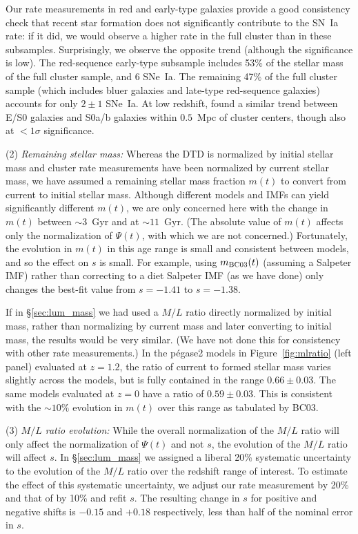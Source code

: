 Our rate measurements in red and early-type galaxies provide a good
consistency check that recent star formation does not significantly
contribute to the SN~Ia rate: if it did, we would observe a higher
rate in the full cluster than in these subsamples. Surprisingly, we
observe the opposite trend (although the significance is low). The
red-sequence early-type subsample includes 53\% of the stellar mass of
the full cluster sample, and 6 SNe~Ia. The remaining 47\% of the full
cluster sample (which includes bluer galaxies and late-type
red-sequence galaxies) accounts for only $2 \pm 1$ SNe~Ia. At low
redshift, \citet{mannucci08a} found a similar trend between E/S0
galaxies and S0a/b galaxies within $0.5$~Mpc of cluster centers,
though also at $<1\sigma$ significance.

(2) \emph{Remaining stellar mass:} Whereas the DTD is normalized by
initial stellar mass and cluster rate measurements have been
normalized by current stellar mass, we have assumed a remaining
stellar mass fraction $m(t)$ to convert from current to initial
stellar mass. Although different models and IMFs can yield significantly
different $m(t)$, we are only concerned here with the change in $m(t)$
between $\sim 3$~Gyr and at $\sim 11$~Gyr. (The absolute value of
$m(t)$ affects only the normalization of $\Psi(t)$, with which we are
not concerned.) Fortunately, the evolution in $m(t)$ in this age range
is small and consistent between models, and so the effect on $s$ is
small. For example, using $m_{\rm BC03}(t)$ (assuming a Salpeter IMF)
rather than correcting to a diet Salpeter IMF (as we have done) only
changes the best-fit value from $s=-1.41$ to $s=-1.38$.

If in \S\ref{sec:lum_mass} we had used a $M/L$ ratio directly
normalized by initial mass, rather than normalizing by current mass
and later converting to initial mass, the results would be very
similar. (We have not done this for consistency with other rate
measurements.) In the {\sc p\'egase2} models in
Figure~\ref{fig:mlratio} (left panel) evaluated at $z=1.2$, the ratio
of current to formed stellar mass varies slightly across the models,
but is fully contained in the range $0.66 \pm 0.03$. The same models
evaluated at $z=0$ have a ratio of $0.59 \pm 0.03$. This is consistent
with the $\sim 10\%$ evolution in $m(t)$ over this range as tabulated
by BC03.

(3) \emph{$M/L$ ratio evolution:} While the overall normalization of
the $M/L$ ratio will only affect the normalization of $\Psi(t)$ and
not $s$, the evolution of the $M/L$ ratio will affect $s$. In
\S\ref{sec:lum_mass} we assigned a liberal 20\% systematic uncertainty to
the evolution of the $M/L$ ratio over the redshift range of
interest. To estimate the effect of this systematic uncertainty, we
adjust our rate measurement by 20\% and that of \citet{sharon10a} by
10\% and refit $s$. The resulting change in $s$ for positive and
negative shifts is $-0.15$ and $+0.18$ respectively, less than half of
the nominal error in $s$.

